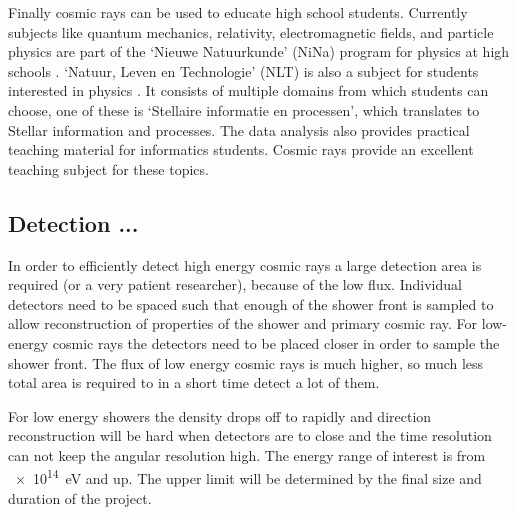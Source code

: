 Finally cosmic rays can be used to educate high school students. Currently subjects like quantum mechanics, relativity, electromagnetic fields, and particle physics are part of the `Nieuwe Natuurkunde' (NiNa) program for physics at high schools  \cite{overheid2012nina}. `Natuur, Leven en Technologie' (NLT) is also a subject for students interested in physics \cite{overheid2011nlt}. It consists of multiple domains from which students can choose, one of these is `Stellaire informatie en processen', which translates to Stellar information and processes. The data analysis also provides practical teaching material for informatics students. Cosmic rays provide an excellent teaching subject for these topics.

\subsection{Detection ...}

In order to efficiently detect high energy cosmic rays a large detection area is required (or a very patient researcher), because of the low flux. Individual detectors need to be spaced such that enough of the shower front is sampled to allow reconstruction of properties of the shower and primary cosmic ray. For low-energy cosmic rays the detectors need to be placed closer in order to sample the shower front. The flux of low energy cosmic rays is much higher, so much less total area is required to in a short time detect a lot of them.

For low energy showers the density drops off to rapidly and direction reconstruction will be hard when detectors are to close and the time resolution can not keep the angular resolution high. The energy range of interest is from \SI{e14}{\eV} and up. The upper limit will be determined by the final size and duration of the project.

